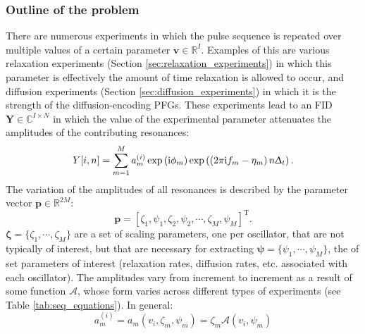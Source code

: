\subsubsection{Outline of the problem}
There are numerous experiments in which the pulse sequence is repeated over
multiple values of a certain parameter $\symbf{v} \in \mathbb{R}^I$. Examples
of this are various relaxation experiments (Section
\ref{sec:relaxation_experiments}) in which this parameter is effectively the
amount of time relaxation is allowed to occur, and diffusion experiments
(Section \ref{sec:diffusion_experiments}) in which it is the strength of the
diffusion-encoding \acp{PFG}. These experiments lead to an FID $\symbf{Y} \in
\mathbb{C}^{I \times N}$ in which the value of the experimental parameter
attenuates the amplitudes of the contributing resonances:
\begin{equation}
    Y[i, n] = \sum_{m=1}^M a_m^{(i)} \exp\left(\mathrm{i} \phi_m\right)
        \exp\left(\left(2 \pi \mathrm{i} f_m - \eta_m \right) n \Updelta_t\right).
\end{equation}
The variation of the amplitudes of all resonances is described by the parameter
vector $\symbf{p} \in \mathbb{R}^{2M}$:
\begin{equation}
    \symbf{p} = \left[
        \zeta_1, \psi_1, \zeta_2, \psi_2, \cdots, \zeta_M, \psi_M
    \right]^{\mathrm{T}}.
\end{equation}
$\symbf{\zeta} = \lbrace\zeta_1, \cdots, \zeta_M\rbrace$ are a set of scaling
parameters, one per oscillator, that are not typically of
interest, but that are necessary for extracting  $\symbf{\psi} = \lbrace
\psi_1, \cdots, \psi_M \rbrace$, the of set parameters of interest (relaxation
rates, diffusion rates, etc. associated with each oscillator). The amplitudes
vary from increment to increment as a result of some function $\mathcal{A}$,
whose form varies across different types of experiments (see Table
\ref{tab:seq_equations}). In general:
\begin{equation}
    a^{(i)}_m = a_m(v_i, \zeta_m, \psi_m) = \zeta_m \mathcal{A}\left(v_i, \psi_m \right)
\end{equation}

